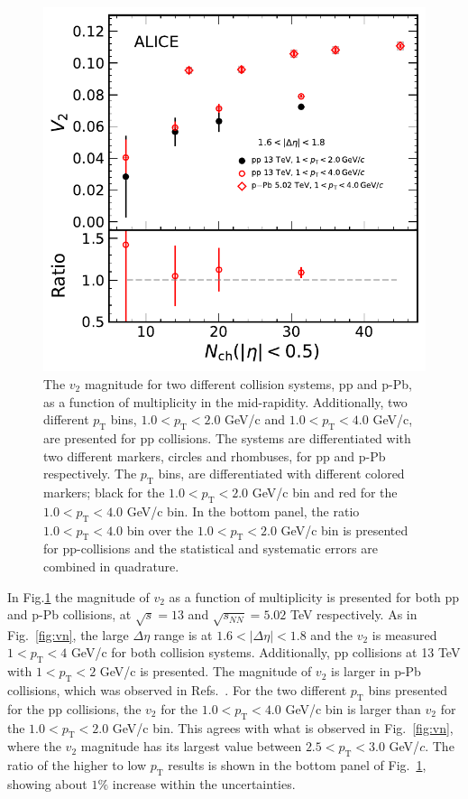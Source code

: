 \begin{figure}[h!]
	\centering
	\includegraphics[width=0.55 \textwidth]{figures/Fig6_v2Mult_allSystemsComp2.pdf} 
	\caption{The $v_2$ magnitude for two different collision systems, pp and p-Pb, as a function of multiplicity in the mid-rapidity. Additionally, two different $p_\mathrm{T}$ bins, $1.0<p_\mathrm{T}<2.0$ GeV/c and $1.0<p_\mathrm{T}<4.0$ GeV/c, are presented for pp collisions. The systems are differentiated with two different markers, circles and rhombuses, for pp and p-Pb respectively. The $p_\mathrm{T}$ bins, are differentiated with different colored markers; black for the $1.0<p_\mathrm{T}<2.0$ GeV/c bin and red for the $1.0<p_\mathrm{T}<4.0$ GeV/c bin. In the bottom panel, the ratio $1.0<p_\mathrm{T}<4.0$ bin over the $1.0<p_\mathrm{T}<2.0$ GeV/c bin is presented for pp-collisions and the statistical and systematic errors are combined in quadrature.} 
	\label{fig:v2mult}
\end{figure}

In Fig.\ref{fig:v2mult} the magnitude of $v_2$ as a function of multiplicity is presented for both pp and p-Pb collisions, at $\sqrt{s}=13$ and $\sqrt{s_{NN}}=5.02$ TeV respectively. As in Fig.~\ref{fig:vn}, the large $\Delta\eta$ range is at $1.6<|\Delta\eta|<1.8$ and the $v_2$ is measured $1<p_{\mathrm{T}}<4$ GeV/c for both collision systems. Additionally, pp collisions at 13 TeV with $1<p_{\mathrm{T}}<2$ GeV/c is presented. The magnitude of $v_2$ is larger in p-Pb collisions, which was observed in Refs.~\cite{ATLAS:2015hzw,ATLAS:2016yzd, Khachatryan:2015lva}. For the two different $p_\mathrm{T}$ bins presented for the pp collisions, the $v_2$ for the $1.0<p_\mathrm{T}<4.0$ GeV/c bin is larger than $v_2$ for the $1.0<p_\mathrm{T}<2.0$ GeV/c bin. This agrees with what is observed in Fig.~\ref{fig:vn}, where the $v_2$ magnitude has its largest value between $2.5<p_\mathrm{T}<3.0$ GeV/$c$. The ratio of the higher to low $p_\mathrm{T}$ results is shown in the bottom panel of Fig.~\ref{fig:v2mult}, showing about $1\%$ increase within the uncertainties.
%

